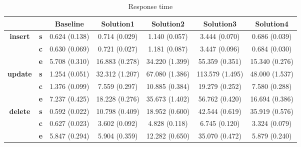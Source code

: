 \begin{table}[h]
\newcommand{\B}[1]{\colorbox{light-gray}{#1}}
 \centering
\caption{Response time}\label{t:}
\begin{tabular}{ccccccc}
\toprule
&&\textbf{Baseline} & \textbf{Solution1} & \textbf{Solution2} & \textbf{Solution3} & \textbf{Solution4}\\
\midrule
\multirow{3}{*}{\textbf{insert}} & \textbf{s} & 0.624 (0.138) & 0.714 (0.029) & 1.140 (0.057) & 3.444 (0.070) & 0.686 (0.039)\\
 & \textbf{c} & 0.630 (0.069) & 0.721 (0.027) & 1.181 (0.087) & 3.447 (0.096) & 0.684 (0.030)\\
 & \textbf{e} & 5.708 (0.310) & 16.883 (0.278) & 34.220 (1.399) & 55.359 (0.351) & 15.340 (0.276)\\
\midrule
\multirow{3}{*}{\textbf{update}} & \textbf{s} & 1.254 (0.051) & 32.312 (1.207) & 67.080 (1.386) & 113.579 (1.495) & 48.000 (1.537)\\
 & \textbf{c} & 1.376 (0.099) & 7.559 (0.297) & 10.885 (0.384) & 19.279 (0.252) & 7.580 (0.288)\\
 & \textbf{e} & 7.237 (0.425) & 18.228 (0.276) & 35.673 (1.402) & 56.762 (0.420) & 16.694 (0.386)\\
\midrule
\multirow{3}{*}{\textbf{delete}} & \textbf{s} & 0.592 (0.022) & 10.798 (0.409) & 18.952 (0.600) & 42.544 (0.619) & 35.919 (0.576)\\
 & \textbf{c} & 0.627 (0.023) & 3.602 (0.092) & 4.828 (0.118) & 6.745 (0.120) & 3.324 (0.079)\\
 & \textbf{e} & 5.847 (0.294) & 5.904 (0.359) & 12.282 (0.650) & 35.070 (0.472) & 5.879 (0.240)\\
\bottomrule
\end{tabular}
\end{table}



